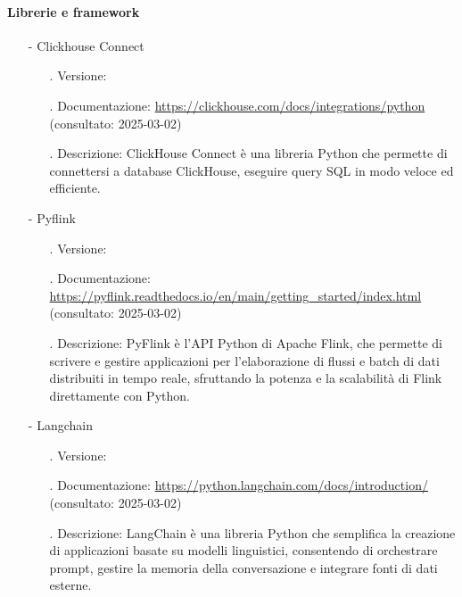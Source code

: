 \documentclass[10pt]{article}
\begin{document}
\begin{justify}
            \paragraph{Librerie e framework}
                \begin{itemize}
                    \item[-] Clickhouse Connect
                        \begin{itemize}
                            \item[.] Versione:
                            \item[.] Documentazione: \url{https://clickhouse.com/docs/integrations/python} (consultato: 2025-03-02)
                            \item[.] Descrizione: ClickHouse Connect è una libreria Python che permette di connettersi a database ClickHouse, eseguire query SQL 
                            in modo veloce ed efficiente.
                        \end{itemize}
                    \item[-] Pyflink
                        \begin{itemize}
                            \item[.] Versione:
                            \item[.] Documentazione: \url{https://pyflink.readthedocs.io/en/main/getting_started/index.html} (consultato: 2025-03-02)
                            \item[.] Descrizione: PyFlink è l’API Python di Apache Flink, che permette di scrivere e gestire applicazioni per l'elaborazione di 
                            flussi e batch di dati distribuiti in tempo reale, sfruttando la potenza e la scalabilità di Flink direttamente con Python.
                        \end{itemize}
                    \item[-] Langchain
                        \begin{itemize}
                            \item[.] Versione:
                            \item[.] Documentazione: \url{https://python.langchain.com/docs/introduction/} (consultato: 2025-03-02)
                            \item[.] Descrizione: LangChain è una libreria Python che semplifica la creazione di applicazioni basate su modelli linguistici, 
                            consentendo di orchestrare prompt, gestire la memoria della conversazione e integrare fonti di dati esterne.

\end{itemize}
\end{itemize}
\end{justify}
\end{document}
